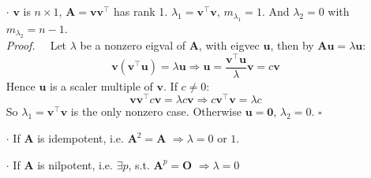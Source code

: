 \documentclass[a4paper, 11pt]{article}
\newcommand{\boxwidth}{430pt}
\begin{document}
\section{}
\begin{itemize}
  \item[$\cdot$] $\bm{v}$ is $n\times 1$,  $\bm{A}=\bm{v}\bm{v}^{\top}$ has rank 1. $\lambda_1=\bm{v}^{\top}\bm{v}$, $m_{\lambda_1}=1$. And $\lambda_2 =0$ with $m_{\lambda_2}=n-1$.\\
  \textit{Proof.~~} Let $\lambda$ be a nonzero eigval of $\bm{A}$, with eigvec $\bm{u}$, then by $\bm{Au}=\lambda \bm{u}$:
  $$
  \bm{v}(\bm{v}^{\top}\bm{u}) = \lambda \bm{u} \Rightarrow \bm{u} = \frac{\bm{v}^{\top} \bm{u}}{\lambda}\bm{v} = c \bm{v}
  $$
  Hence $\bm{u}$ is a scaler multiple of $\bm{v}$. If $c\ne 0$:
  $$
  \bm{v}\bm{v}^{\top}c \bm{v} = \lambda c \bm{v} \Rightarrow c \bm{v}^{\top} \bm{v} = \lambda c
  $$
  So $\lambda_1=\bm{v}^{\top} \bm{v}$ is the only nonzero case. Otherwise $\bm{u}=\bm{0}$, $\lambda_2=0$. $\square$

  \item[$\cdot$] If $\bm{A}$ is idempotent, i.e. $\bm{A}^2= \bm{A}$ $\Rightarrow\lambda=0$ or $1$.
  \item[$\cdot$] If $\bm{A}$ is nilpotent, i.e. $\exists p$, s.t. $\bm{A}^p= \bm{O}$ $\Rightarrow \lambda=0$
\end{itemize}

\fbox{
	\parbox{\boxwidth}{
	1
	}
}
\end{document}
